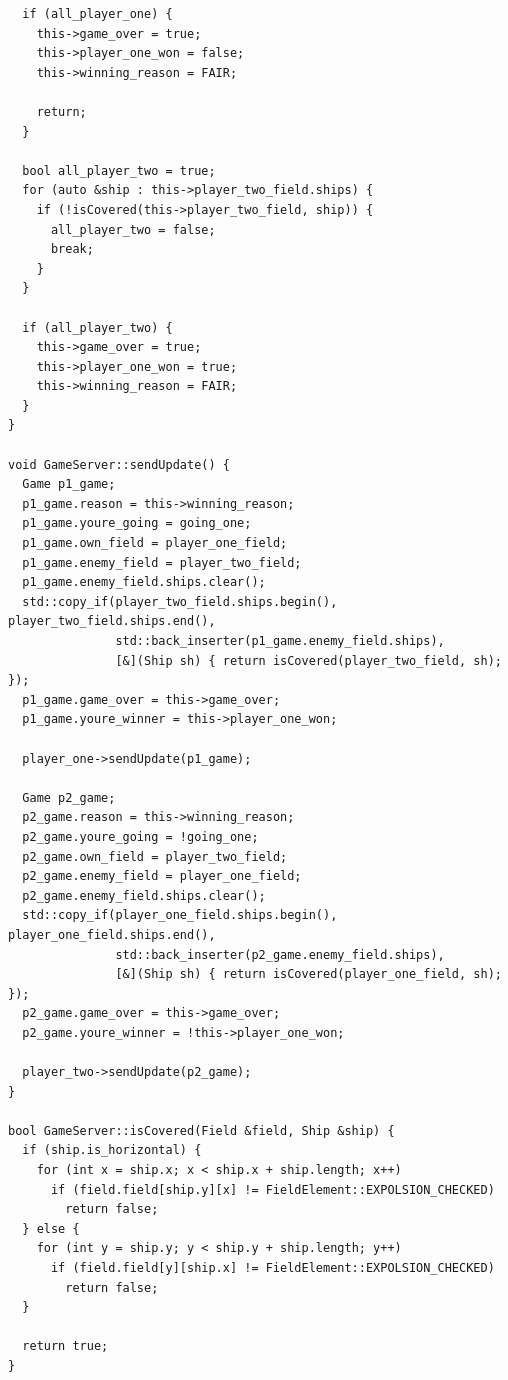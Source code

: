 \documentclass[a4paper,14pt]{extarticle}
\begin{document}
\begin{verbatim}
  if (all_player_one) {
    this->game_over = true;
    this->player_one_won = false;
    this->winning_reason = FAIR;

    return;
  }

  bool all_player_two = true;
  for (auto &ship : this->player_two_field.ships) {
    if (!isCovered(this->player_two_field, ship)) {
      all_player_two = false;
      break;
    }
  }

  if (all_player_two) {
    this->game_over = true;
    this->player_one_won = true;
    this->winning_reason = FAIR;
  }
}

void GameServer::sendUpdate() {
  Game p1_game;
  p1_game.reason = this->winning_reason;
  p1_game.youre_going = going_one;
  p1_game.own_field = player_one_field;
  p1_game.enemy_field = player_two_field;
  p1_game.enemy_field.ships.clear();
  std::copy_if(player_two_field.ships.begin(), player_two_field.ships.end(),
               std::back_inserter(p1_game.enemy_field.ships),
               [&](Ship sh) { return isCovered(player_two_field, sh); });
  p1_game.game_over = this->game_over;
  p1_game.youre_winner = this->player_one_won;

  player_one->sendUpdate(p1_game);

  Game p2_game;
  p2_game.reason = this->winning_reason;
  p2_game.youre_going = !going_one;
  p2_game.own_field = player_two_field;
  p2_game.enemy_field = player_one_field;
  p2_game.enemy_field.ships.clear();
  std::copy_if(player_one_field.ships.begin(), player_one_field.ships.end(),
               std::back_inserter(p2_game.enemy_field.ships),
               [&](Ship sh) { return isCovered(player_one_field, sh); });
  p2_game.game_over = this->game_over;
  p2_game.youre_winner = !this->player_one_won;

  player_two->sendUpdate(p2_game);
}

bool GameServer::isCovered(Field &field, Ship &ship) {
  if (ship.is_horizontal) {
    for (int x = ship.x; x < ship.x + ship.length; x++)
      if (field.field[ship.y][x] != FieldElement::EXPOLSION_CHECKED)
        return false;
  } else {
    for (int y = ship.y; y < ship.y + ship.length; y++)
      if (field.field[y][ship.x] != FieldElement::EXPOLSION_CHECKED)
        return false;
  }

  return true;
}


\end{verbatim}
\end{document}
